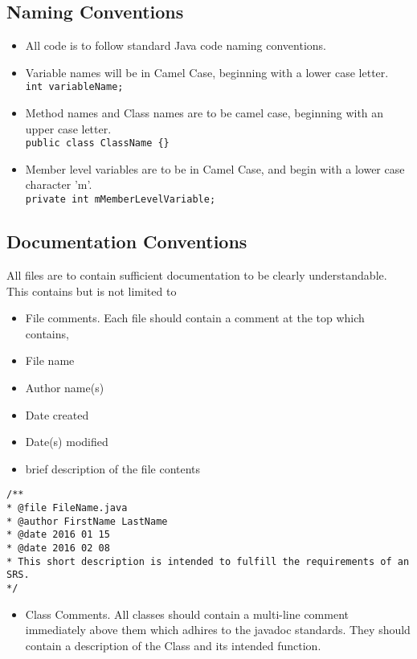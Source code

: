 \documentclass{scrreprt}
\begin{document}
\subsection{Naming Conventions}
\begin{itemize}
\item All code is to follow standard Java code naming conventions.
\item Variable names will be in Camel Case, beginning with a lower case letter.\\
\texttt{int variableName;}
\item Method names and Class names are to be camel case, beginning with an upper case letter. \\
\texttt{public class ClassName \{\}}
\item Member level variables are to be in Camel Case, and begin with a lower case character 'm'. \\
\texttt{private int mMemberLevelVariable;}
\end{itemize}

\subsection{Documentation Conventions}
All files are to contain sufficient documentation to be clearly understandable. This 
contains but is not limited to
\begin{itemize}
\item File comments. Each file should contain a comment at the top which contains,
\item File name
\item Author name(s)
\item Date created
\item Date(s) modified
\item brief description of the file contents
\end{itemize}

\texttt{/** \\}
\texttt{* @file FileName.java \\}
\texttt{* @author FirstName LastName\\}
\texttt{* @date 2016 01 15 \\}
\texttt{* @date 2016 02 08\\}
\texttt{* This short description is intended to fulfill the requirements of an SRS. \\}
\texttt{*/ \\}

\begin{itemize}
\item Class Comments. All classes should contain a multi-line comment immediately above them which adhires to 
the javadoc standards. They should contain a description of the Class and its intended function. \\
\end{itemize}
\end{document}
